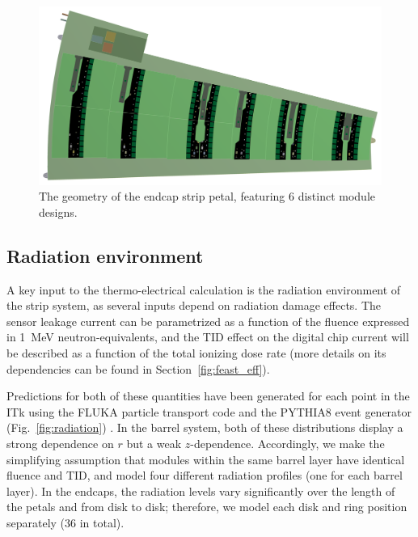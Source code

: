 \begin{figure}[ht]
\centering
\includegraphics[width=0.6\linewidth]{figures/petal_m30C_0Wm2C_Setup.png}
\caption{The geometry of the endcap strip petal, featuring 6 distinct module designs.}
\label{fig:endcapgeometry}
\end{figure}

\subsection{Radiation environment}
A key input to the thermo-electrical calculation is the radiation environment of the strip system, as several inputs depend on radiation damage effects. The sensor leakage current can be parametrized as  a function of the fluence expressed in 1~MeV neutron-equivalents, and the TID effect on the digital chip current will be described as a function of the total ionizing dose rate (more details on its dependencies can be found in Section~\ref{fig:feast_eff}). 

Predictions for both of these quantities have been generated for each point in the ITk using the FLUKA particle transport code and the PYTHIA8 event generator (Fig.~\ref{fig:radiation}) \cite{background}. In the barrel system, both of these distributions display a strong dependence on $r$ but a weak $z$-dependence. Accordingly, we make the simplifying assumption that modules within the same barrel layer have identical fluence and TID, and model four different radiation profiles (one for each barrel layer). In the endcaps, the radiation levels vary significantly over the length of the petals and from disk to disk; therefore, we model each disk and ring position separately (36 in total).

